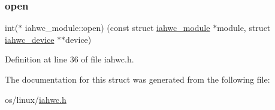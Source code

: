 \subsubsection{\texorpdfstring{open}{open}}
{\footnotesize\ttfamily int($\ast$ iahwc\+\_\+module\+::open) (const struct \mbox{\hyperlink{structiahwc__module}{iahwc\+\_\+module}} $\ast$module, struct \mbox{\hyperlink{structiahwc__device}{iahwc\+\_\+device}} $\ast$$\ast$device)}



Definition at line 36 of file iahwc.\+h.



The documentation for this struct was generated from the following file\+:\begin{DoxyCompactItemize}
\item 
os/linux/\mbox{\hyperlink{iahwc_8h}{iahwc.\+h}}\end{DoxyCompactItemize}
